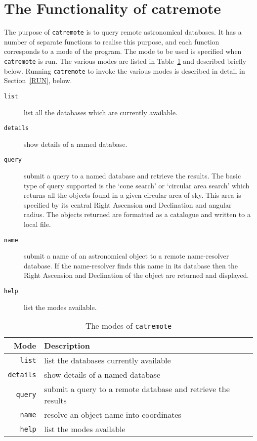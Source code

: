 \documentclass[twoside,11pt]{article}
\newcommand{\xlabel}[1]{}
\renewcommand{\_}{\texttt{\symbol{95}}}
\begin{document}
\section{\xlabel{FUNC}\label{FUNC}The Functionality of catremote}

The purpose of {\tt catremote} is to query remote astronomical databases.
It has a number of separate functions to realise this purpose, and each
function corresponds to a mode of the program.  The mode to be used is
specified when {\tt catremote} is run.  The various modes are listed in
Table~\ref{MODES} and described briefly below.  Running {\tt catremote} to
invoke the various modes is described in detail in Section~\ref{RUN},
below.

\begin{description}

  \item[{\tt list}] list all the databases which are currently available.

  \item[{\tt details}] show details of a named database.

  \item[{\tt query}] submit a query to a named database and retrieve the
   results.  The basic type of query supported is the `cone search' or
   `circular area search' which returns all the objects found in a given
   circular area of sky.  This area is specified by its central Right
   Ascension and Declination and angular radius.  The objects returned are
   formatted as a catalogue and written to a local file.

  \item[{\tt name}] submit a name of an astronomical object to a remote
   name-resolver database.  If the name-resolver finds this name in its
   database then the Right Ascension and Declination of the object are
   returned and displayed.

  \item[{\tt help}] list the modes available.

\end{description}

\begin{table}[htbp]

\begin{center}
\begin{tabular}{rl}
Mode          &  Description \\ \hline
{\tt list}    & list the databases currently available \\
{\tt details} & show details of a named database \\
{\tt query}   & submit a query to a remote database and retrieve the results \\
{\tt name}    & resolve an object name into coordinates \\
{\tt help}    & list the modes available \\
\end{tabular}
\end{center}

\caption{The modes of {\tt catremote}
\label{MODES} }

\end{table}
\end{document}
